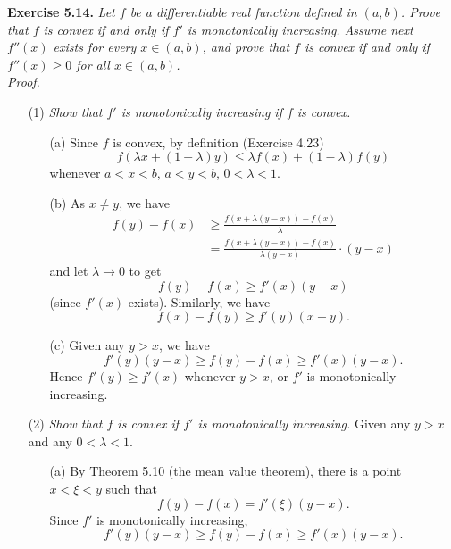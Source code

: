 \documentclass{article}
\begin{document}
\textbf{Exercise 5.14.}
\emph{Let $f$ be a differentiable real function defined in $(a,b)$.
Prove that $f$ is convex if and only if $f'$ is monotonically increasing.
Assume next $f''(x)$ exists for every $x \in (a,b)$,
and prove that $f$ is convex if and only if $f''(x) \geq 0$ for all $x \in (a,b)$.} \\

\emph{Proof.}
\begin{enumerate}
\item[(1)]
  \emph{Show that $f'$ is monotonically increasing if $f$ is convex.}
  \begin{enumerate}
  \item[(a)]
  Since $f$ is convex, by definition (Exercise 4.23)
  \[
    f(\lambda x + (1-\lambda) y) \leq \lambda f(x) + (1-\lambda) f(y)
  \]
  whenever $a < x < b$, $a < y < b$, $0 < \lambda < 1$.

  \item[(b)]
  As $x \neq y$, we have
  \begin{align*}
    f(y) - f(x)
    &\geq \frac{f(x + \lambda(y-x)) - f(x)}{\lambda} \\
    &= \frac{f(x + \lambda(y-x)) - f(x)}{\lambda(y-x)} \cdot (y-x)
  \end{align*}
  and let $\lambda \to 0$ to get
  \[
    f(y) - f(x) \geq f'(x)(y - x)
  \]
  (since $f'(x)$ exists).
  Similarly, we have
  \[
    f(x) - f(y) \geq f'(y)(x - y).
  \]

  \item[(c)]
  Given any $y > x$, we have
  \[
    f'(y)(y - x) \geq f(y) - f(x) \geq f'(x)(y - x).
  \]
  Hence $f'(y) \geq f'(x)$ whenever $y > x$,
  or $f'$ is monotonically increasing.
  \end{enumerate}

\item[(2)]
  \emph{Show that $f$ is convex if $f'$ is monotonically increasing.}
  Given any $y > x$ and any $0 < \lambda < 1$.
  \begin{enumerate}
  \item[(a)]
  By Theorem 5.10 (the mean value theorem), there is a point $x < \xi < y$ such that
  \[
    f(y) - f(x) = f'(\xi)(y - x).
  \]
  Since $f'$ is monotonically increasing,
  \[
    f'(y)(y - x) \geq f(y) - f(x) \geq f'(x)(y - x).
  \]


\end{enumerate}
\end{enumerate}
\end{document}
